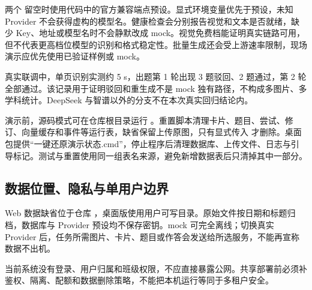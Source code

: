 两个  留空时使用代码中的官方兼容端点预设。显式环境变量优先于预设，未知 Provider 不会获得虚构的模型名。健康检查会分别报告视觉和文本是否就绪，缺少 Key、地址或模型名时不会静默改成 mock。视觉免费档能证明真实链路可用，但不代表更高档位模型的识别和格式稳定性。批量生成还会受上游速率限制，现场演示应优先使用已验证样例或 mock。

真实联调中，单页识别实测约 5 s，出题第 1 轮出现 3 题驳回、2 题通过，第 2 轮全部通过。该记录用于证明驳回和重生成不是 mock 独有路径，不构成多图片、多学科统计。DeepSeek 与智谱以外的分支不在本次真实回归结论内。

演示前，源码模式可在仓库根目录运行 。重置脚本清理卡片、题目、尝试、修订、向量缓存和事件等运行表，缺省保留上传原图，只有显式传入  才删除。桌面包提供“一键还原演示状态.cmd”，停止程序后清理数据库、上传文件、日志与引导标记。测试与重置使用同一组表名来源，避免新增数据表后只清掉其中一部分。

\subsection{数据位置、隐私与单用户边界}

Web 数据缺省位于仓库 ，桌面版使用用户可写目录。原始文件按日期和标题归档，数据库与 Provider 预设均不保存密钥。mock 可完全离线；切换真实 Provider 后，任务所需图片、卡片、题目或作答会发送给所选服务，不能再宣称数据不出机。

当前系统没有登录、用户归属和班级权限，不应直接暴露公网。共享部署前必须补鉴权、隔离、配额和数据删除策略，不能把本机运行等同于多租户安全。
